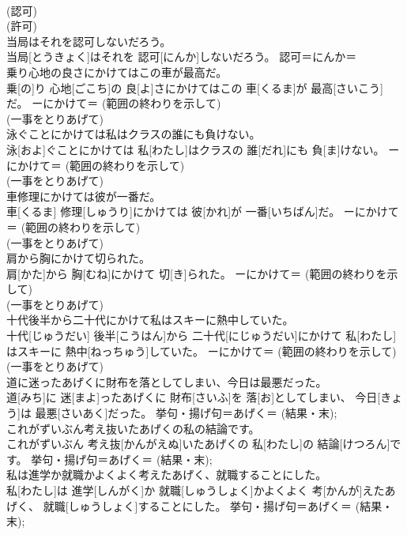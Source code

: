 \documentclass[8pt]{extreport}
\begin{document}
\begin{CJK}{UTF8}{min}
{\\	(認可) 
\\	(許可) 
\\	当局はそれを認可しないだろう。	
\\	当局[とうきょく]はそれを 認可[にんか]しないだろう。	認可＝にんか＝ 
\\	乗り心地の良さにかけてはこの車が最高だ。	
\\	乗[の]り 心地[ごこち]の 良[よ]さにかけてはこの 車[くるま]が 最高[さいこう]だ。	ーにかけて＝ (範囲の終わりを示して) 
\\	(一事をとりあげて) 
\\	泳ぐことにかけては私はクラスの誰にも負けない。	
\\	泳[およ]ぐことにかけては 私[わたし]はクラスの 誰[だれ]にも 負[ま]けない。	ーにかけて＝ (範囲の終わりを示して) 
\\	(一事をとりあげて) 
\\	車修理にかけては彼が一番だ。	
\\	車[くるま] 修理[しゅうり]にかけては 彼[かれ]が 一番[いちばん]だ。	ーにかけて＝ (範囲の終わりを示して) 
\\	(一事をとりあげて) 
\\	肩から胸にかけて切られた。	
\\	肩[かた]から 胸[むね]にかけて 切[き]られた。	ーにかけて＝ (範囲の終わりを示して) 
\\	(一事をとりあげて) 
\\	十代後半から二十代にかけて私はスキーに熱中していた。	
\\	十代[じゅうだい] 後半[こうはん]から 二十代[にじゅうだい]にかけて 私[わたし]はスキーに 熱中[ねっちゅう]していた。	ーにかけて＝ (範囲の終わりを示して) 
\\	(一事をとりあげて) 
\\	道に迷ったあげくに財布を落としてしまい、今日は最悪だった。	
\\	道[みち]に 迷[まよ]ったあげくに 財布[さいふ]を 落[お]としてしまい、 今日[きょう]は 最悪[さいあく]だった。	挙句・揚げ句＝あげく＝ (結果・末); 
\\	これがずいぶん考え抜いたあげくの私の結論です。	
\\	これがずいぶん 考え抜[かんがえぬ]いたあげくの 私[わたし]の 結論[けつろん]です。	挙句・揚げ句＝あげく＝ (結果・末); 
\\	私は進学か就職かよくよく考えたあげく、就職することにした。	
\\	私[わたし]は 進学[しんがく]か 就職[しゅうしょく]かよくよく 考[かんが]えたあげく、 就職[しゅうしょく]することにした。	挙句・揚げ句＝あげく＝ (結果・末); 
}
\end{CJK}
\end{document}
